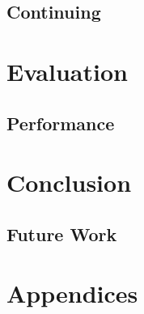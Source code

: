\documentclass{UoYCSproject}
\begin{document}

\section{Continuing} %



\chapter{Evaluation}


\section{Performance}


\chapter{Conclusion}
\section{Future Work}




\chapter{Appendices}
\end{document}

